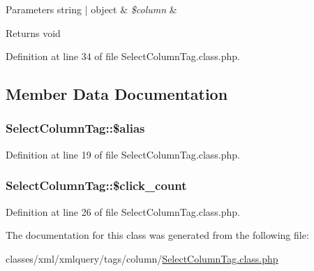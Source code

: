 \begin{DoxyParams}[1]{Parameters}
string | object & {\em \$column} & \\
\hline
\end{DoxyParams}
\begin{DoxyReturn}{Returns}
void 
\end{DoxyReturn}


Definition at line 34 of file Select\+Column\+Tag.\+class.\+php.



\subsection{Member Data Documentation}
\hypertarget{classSelectColumnTag_a152fca9e152d65e4697ad823ffaa101b}{
\subsubsection[{\$alias}]{\setlength{\rightskip}{0pt plus 5cm}Select\+Column\+Tag\+::\$alias}}\label{classSelectColumnTag_a152fca9e152d65e4697ad823ffaa101b}


Definition at line 19 of file Select\+Column\+Tag.\+class.\+php.

\hypertarget{classSelectColumnTag_a5965b8a6c68685c6b99dd88f4fd87f52}{
\subsubsection[{\$click\+\_\+count}]{\setlength{\rightskip}{0pt plus 5cm}Select\+Column\+Tag\+::\$click\+\_\+count}}\label{classSelectColumnTag_a5965b8a6c68685c6b99dd88f4fd87f52}


Definition at line 26 of file Select\+Column\+Tag.\+class.\+php.



The documentation for this class was generated from the following file\+:\begin{DoxyCompactItemize}
\item 
classes/xml/xmlquery/tags/column/\hyperlink{SelectColumnTag_8class_8php}{Select\+Column\+Tag.\+class.\+php}\end{DoxyCompactItemize}
